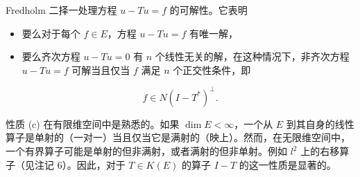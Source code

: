 \begin{remark}\label{remark:6.4}
Fredholm 二择一处理方程 \(u-Tu=f\) 的可解性。它表明
\begin{itemize}
    \item 要么对于每个 \(f \in E\)，方程 \(u-Tu=f\) 有唯一解，
    \item 要么齐次方程 \(u-Tu=0\) 有 \(n\) 个线性无关的解，在这种情况下，非齐次方程 \(u-Tu=f\) 可解当且仅当 \(f\) 满足 \(n\) 个正交性条件，即
\end{itemize}
\[
f \in N(I-T^*)^\perp.
\]
\end{remark}

\begin{remark}\label{remark:6.5}
性质 (c) 在有限维空间中是熟悉的。如果 \(\dim E < \infty\)，一个从 \(E\) 到其自身的线性算子是单射的（一对一）当且仅当它是满射的（映上）。然而，在无限维空间中，一个有界算子可能是单射的但非满射，或者满射的但非单射。例如 \(l^2\) 上的右移算子（见注记 6）。因此，对于 \(T \in K(E)\) 的算子 \(I-T\) 的这一性质是显著的。
\end{remark}

